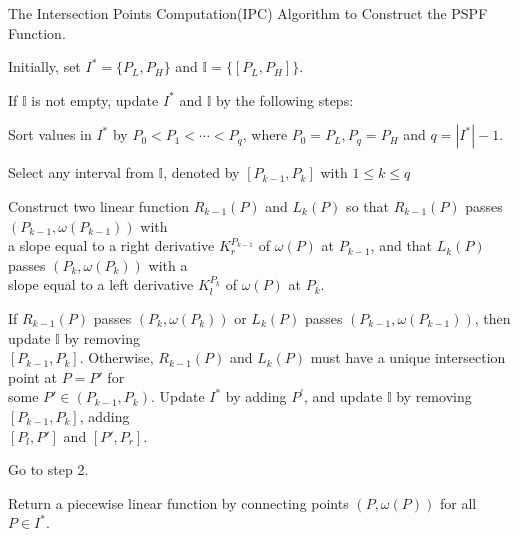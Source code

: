 \begin{algorithm}[H]\label{algoIPC}
\caption{The Intersection Points Computation(IPC) Algorithm to Construct the PSPF Function.}
\begin{algorithmic}[1]

\begin{description}
  \justifying
  \item[Step 1.] Initially, set $I^*=\{P_L,P_H\}$ and $\mathbb{I}= \{[P_L,P_H]\}$.
  \item[Step 2.] If $\mathbb{I}$ is not empty, update $I^*$ and $\mathbb{I}$ by the following steps:
  \item[Step 3.] Sort values in $I^*$ by $P_0<P_1<\cdots<P_q$, where $P_0 = P_L,P_q = P_H$ and $q = |I^*|-1$.
  \item[Step 4.]
  Select any interval from $\mathbb{I}$, denoted by $[P_{k-1},P_{k}]$ with $1\leq k \leq q$
  \item[Step 5.]
  Construct two linear function $ R_{k-1}(P)$ and $ L_{k}(P)$ so that $ R_{k-1}(P)$ passes $(P_{k-1},\omega(P_{k-1}))$ with \\
  \vspace{10pt}
  a slope equal to a right derivative $K_{r}^{P_{k-1}}$ of $\omega(P)$ at $P_{k-1}$, and that $L_{k}(P)$ passes $(P_{k},\omega(P_{k}))$ with a \\
  \vspace{10pt}
  slope equal to a left derivative $K_{l}^{P_{k}}$
  of $\omega(P)$ at $P_k$.
  \item[Step 6.] If $R_{k-1}(P)$ passes $(P_{k},\omega(P_{k}))$ or $L_{k}(P)$ passes $(P_{k-1},\omega(P_{k-1}))$, then update $\mathbb{I}$ by removing \\

  $[P_{k-1},P_{k}]$. Otherwise, $R_{k-1}(P)$ and $L_{k}(P)$ must have a unique intersection point at $P=P'$ for  \\
  \vspace{10pt}
  some $P' \in (P_{k-1},P_{k})$.
  Update $I^*$ by adding $P^'$, and update $\mathbb{I}$ by removing $[P_{k-1},P_{k}]$, adding \\
  \vspace{10pt}
  $[P_l,P']$ and $[P',P_r]$.
  \item[Step 7.] Go to step 2.
  \item[Step 8.] Return a piecewise linear function by connecting points $(P,\omega(P))$ for all $P \in I^*$.

\end{description}
\end{algorithmic}
\end{algorithm}

